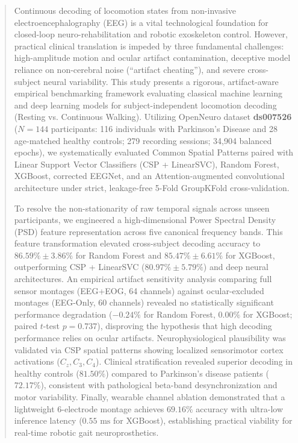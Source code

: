 \documentclass[review,12pt]{elsarticle}
\begin{document}
\begin{frontmatter}
\begin{abstract}
Continuous decoding of locomotion states from non-invasive electroencephalography (EEG) is a vital technological foundation for closed-loop neuro-rehabilitation and robotic exoskeleton control. However, practical clinical translation is impeded by three fundamental challenges: high-amplitude motion and ocular artifact contamination, deceptive model reliance on non-cerebral noise (``artifact cheating''), and severe cross-subject neural variability. This study presents a rigorous, artifact-aware empirical benchmarking framework evaluating classical machine learning and deep learning models for subject-independent locomotion decoding (Resting vs. Continuous Walking). Utilizing OpenNeuro dataset \textbf{ds007526} ($N=144$ participants: 116 individuals with Parkinson's Disease and 28 age-matched healthy controls; 279 recording sessions; 34,904 balanced epochs), we systematically evaluated Common Spatial Patterns paired with Linear Support Vector Classifiers (CSP + LinearSVC), Random Forest, XGBoost, corrected EEGNet, and an Attention-augmented convolutional architecture under strict, leakage-free 5-Fold GroupKFold cross-validation. 

To resolve the non-stationarity of raw temporal signals across unseen participants, we engineered a high-dimensional Power Spectral Density (PSD) feature representation across five canonical frequency bands. This feature transformation elevated cross-subject decoding accuracy to $86.59\% \pm 3.86\%$ for Random Forest and $85.47\% \pm 6.61\%$ for XGBoost, outperforming CSP + LinearSVC ($80.97\% \pm 5.79\%$) and deep neural architectures. An empirical artifact sensitivity analysis comparing full sensor montages (EEG+EOG, 64 channels) against ocular-excluded montages (EEG-Only, 60 channels) revealed no statistically significant performance degradation ($-0.24\%$ for Random Forest, $0.00\%$ for XGBoost; paired $t$-test $p=0.737$), disproving the hypothesis that high decoding performance relies on ocular artifacts. Neurophysiological plausibility was validated via CSP spatial patterns showing localized sensorimotor cortex activations ($C_z, C_3, C_4$). Clinical stratification revealed superior decoding in healthy controls ($81.50\%$) compared to Parkinson's disease patients ($72.17\%$), consistent with pathological beta-band desynchronization and motor variability. Finally, wearable channel ablation demonstrated that a lightweight 6-electrode montage achieves $69.16\%$ accuracy with ultra-low inference latency ($0.55\text{ ms}$ for XGBoost), establishing practical viability for real-time robotic gait neuroprosthetics.
\end{abstract}


\end{frontmatter}
\end{document}
